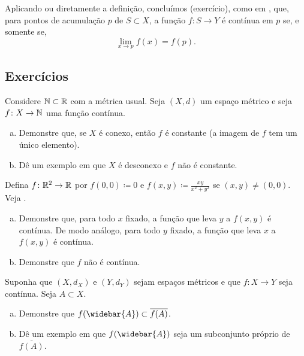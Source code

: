 Aplicando  ou diretamente a definição, concluímos
(exercício), como em , que, para pontos de acumulação $p$ de $S
\subset X$, a função
$f \colon S \to Y$ é contínua em $p$ se, e somente se,
\begin{equation*}
\lim_{x \to p} f(x) = f(p) .
\end{equation*}

\subsection{Exercícios}

\begin{exercise}
Considere ${\mathbb{N}} \subset {\mathbb{R}}$ com a métrica usual. Seja $(X,d)$ um
espaço métrico e seja $f \colon X \to {\mathbb{N}}$ uma função contínua.
\begin{enumerate}[a)]
\item
Demonstre que, se $X$ é conexo,
então $f$ é constante (a imagem de $f$ tem um único elemento).
\item
Dê um exemplo em que $X$ é desconexo e $f$ não é constante.
\end{enumerate}
\end{exercise}

\begin{exercise} \label{exercise:dicontR2}
\pagebreak[2]
Defina $f \colon {\mathbb{R}}^2 \to {\mathbb{R}}$ por $f(0,0) \coloneqq 0$ e
$f(x,y) \coloneqq \frac{xy}{x^2+y^2}$ se $(x,y) \neq (0,0)$.
Veja .
\begin{enumerate}[a)]
\item
Demonstre que, para todo $x$ fixado,
a função que leva $y$ a $f(x,y)$ é contínua. De modo análogo,
para todo $y$ fixado, a função que leva $x$ a $f(x,y)$ é contínua.
\item
Demonstre que $f$ não é contínua.
\end{enumerate}
\end{exercise}

\begin{exercise}
\pagebreak[2]
Suponha que $(X,d_X)$ e $(Y,d_Y)$ sejam espaços métricos e que
$f \colon X \to Y$ seja contínua.
Seja $A \subset X$.
\begin{enumerate}[a)]
\item
Demonstre que $f(\widebar{A}) \subset \overline{f(A)}$.
\item
Dê um exemplo em que $f(\widebar{A})$ seja um subconjunto próprio de
$\overline{f(A)}$.
\end{enumerate}
\end{exercise}

